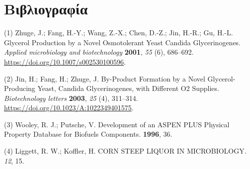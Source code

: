 \documentclass[11pt]{article}
\begin{document}
\section{Βιβλιογραφία}
\label{sec:org9069884}
\hypertarget{citeproc_bib_item_1}{(1) Zhuge, J.; Fang, H.-Y.; Wang, Z.-X.; Chen, D.-Z.; Jin, H.-R.; Gu, H.-L. Glycerol Production by a Novel Osmotolerant Yeast Candida Glycerinogenes. \textit{Applied microbiology and biotechnology} \textbf{2001}, \textit{55} (6), 686–692. \url{https://doi.org/10.1007/s002530100596}.}

\hypertarget{citeproc_bib_item_2}{(2) Jin, H.; Fang, H.; Zhuge, J. By-Product Formation by a Novel Glycerol-Producing Yeast, Candida Glycerinogenes, with Different O2 Supplies. \textit{Biotechnology letters} \textbf{2003}, \textit{25} (4), 311–314. \url{https://doi.org/10.1023/A:1022349401575}.}

\hypertarget{citeproc_bib_item_3}{(3) Wooley, R. J.; Putsche, V. Development of an ASPEN PLUS Physical Property Database for Biofuels Components. \textbf{1996}, 36.}

\hypertarget{citeproc_bib_item_4}{(4) Liggett, R. W.; Koffler, H. CORN STEEP LIQUOR IN MICROBIOLOGY. \textit{12}, 15.}
\end{document}
